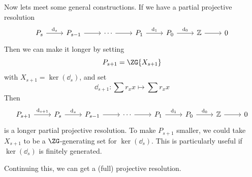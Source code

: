 \documentclass{article}
\begin{document}
Now lets meet some general constructions. If we have a partial projective resolution
\[\begin{tikzcd}
	{P_s} & {P_{s-1}} & \cdots & {P_1} & {P_0} & \Z & 0
	\arrow["{\dd_s}", from=1-1, to=1-2]
	\arrow[from=1-3, to=1-4]
	\arrow[from=1-2, to=1-3]
	\arrow["{\dd_1}", from=1-4, to=1-5]
	\arrow["{\dd_0}", from=1-5, to=1-6]
	\arrow[from=1-6, to=1-7]
\end{tikzcd}\]
Then we can make it longer by setting
\[P_{s+1} = \ZG\{X_{s+1}\}\]
with \(X_{s+1} = \ker(\dd_s)\), and set
\[\dd_{s+1} : \sum r_x x \mapsto \sum r_x x\]
Then
\[\begin{tikzcd}
	{P_{s+1}} & {P_s} & {P_{s-1}} & \cdots & {P_1} & {P_0} & \Z & 0
	\arrow["{\dd_s}", from=1-2, to=1-3]
	\arrow[from=1-4, to=1-5]
	\arrow[from=1-3, to=1-4]
	\arrow["{\dd_1}", from=1-5, to=1-6]
	\arrow["{\dd_0}", from=1-6, to=1-7]
	\arrow[from=1-7, to=1-8]
	\arrow["{\dd_{s+1}}", from=1-1, to=1-2]
\end{tikzcd}\]
is a longer partial projective resolution. To make \(P_{s+1}\) smaller, we could take \(X_{s+1}\) to be a \(\ZG\)-generating set for \(\ker(\dd_s)\). This is particularly useful if \(\ker(\dd_s)\) is finitely generated.

Continuing this, we can get a (full) projective resolution.
\end{document}
